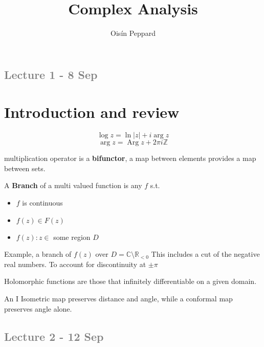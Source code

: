 \documentclass{article}
\title{Complex Analysis}
\author{Oisín Peppard}
\DeclareMathOperator\Arg{Arg}
\begin{document}
\maketitle

\textcolor{Gray}{\subsection*{Lecture 1 - 8 Sep}}

\section{Introduction and review}

\begin{equation}
    \log{z} = \ln{|z|} + i \arg{z}
\end{equation}
\begin{equation}
    \arg{z} = \Arg{z} + 2\pi i \mathbb{Z}
\end{equation}

\begin{flushleft}
 multiplication operator is a \textbf{bifunctor}, a map between elements provides a map between sets. 

\par A \textbf{Branch} of a multi valued function is any $f$ s.t. 


\begin{itemize}
    \item $f$ is continuous
    \item $f(z) \in F(z) $
    \item $f(z) : z \in $ some region $D$
\end{itemize}

Example, a branch of $f(z)$ over $D = \mathbb{C} \setminus \mathbb{R}_{<0}$ This includes a cut of the negative real numbers. To account for discontinuity at $\pm{\pi}$

\par
Holomorphic functions are those that infinitely differentiable on a given domain.
\par
An I Isometric map preserves distance and angle, while a conformal map preserves angle alone.
\end{flushleft}

\textcolor{gray}{\subsection*{Lecture 2 - 12 Sep}}
\end{document}

